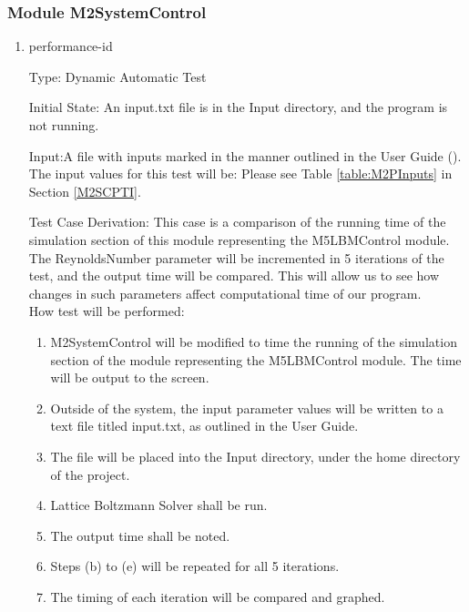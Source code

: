 \documentclass[12pt, titlepage]{article}
\newcommand{\myprogname}{Lattice Boltzmann Solver}
\newcounter{uvtestcounter} %
\begin{document}
\subsubsection{Module M2SystemControl}
		
\begin{enumerate}

\item{performance-id\theuvtestcounter\\}

Type: Dynamic Automatic Test

Initial State: An input.txt file is in the Input directory, and the program is not running.

Input:A file with inputs marked in the manner outlined in the
User Guide (\citet{LBM_UserGuide_PM}).\\The input values for this test will
be: Please see Table \ref{table:M2PInputs} in Section \ref{M2SCPTI}.

Test Case Derivation: This case is a comparison of the running time of the simulation section of this module representing the M5LBMControl module.  
The ReynoldsNumber parameter will be incremented in 5 iterations of the test, and the output time will be compared. This will allow us to see how changes in such parameters affect computational time of our program.\\

How test will be performed:
\begin{enumerate}
	\item M2SystemControl will be modified to time the running of the simulation section of the module representing the M5LBMControl module. The time will be output to the screen.
	\item Outside of the system, the input parameter values will be written to a text file titled input.txt, as outlined in the User Guide.
	\item The file will be placed into the Input directory, under the home directory of the project.
	\item {\myprogname} shall be run. 
	\item The output time shall be noted.
	\item Steps (b) to (e) will be repeated for all 5 iterations.
	\item The timing of each iteration will be compared and graphed.
\end{enumerate}

\end{enumerate}
\end{document}
